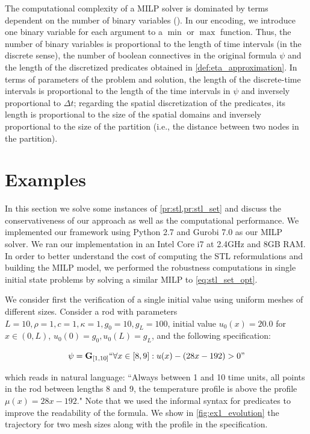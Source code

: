 \documentclass[oribibl]{llncs/llncs}
\newcommand{\Always}{\mathbf{G}}
\begin{document}
The computational complexity of a MILP solver is dominated by terms dependent on
the number of binary variables (\cite{}). In our encoding, we introduce one
binary variable for each argument to a $\min$ or $\max$ function. Thus, the
number of binary variables is proportional to the length of time intervals (in
the discrete sense), the number of boolean connectives in the original formula
$\psi$ and the length of the discretized predicates obtained in
\cref{def:eta_approximation}. In terms of parameters of the problem and solution,
the length of the discrete-time intervals is proportional to the length of the time
intervals in $\psi$ and inversely proportional to $\Delta t$; regarding the
spatial discretization of the predicates, its length is proportional to the size
of the spatial domains and inversely proportional to the size of the partition
(i.e., the distance between two nodes in the partition).

\section{Examples}
\label{sec:examples}

In this section we solve some instances of \cref{pr:stl,pr:stl_set} and discuss
the conservativeness of our approach as well as the computational performance.
We implemented our framework using Python 2.7 and Gurobi 7.0 as our MILP solver.
We ran our implementation in an Intel Core i7 at 2.4GHz and 8GB RAM. In order to
better understand the cost of computing the STL reformulations and building the
MILP model, we performed the robustness computations in single initial state
problems by solving a similar MILP to \cref{eq:stl_set_opt}.

We consider first the verification of a single initial value using uniform
meshes of different sizes. Consider a rod with parameters $L = 10, \rho = 1, c =
1, \kappa = 1, g_0 = 10, g_L = 100$, initial value $u_0(x) = 20.0$
for $x \in (0, L)$, $u_0(0) = g_0, u_0(L) = g_L$, and the following specification:

\begin{equation}
    \psi = \Always_{[1,10]} ``\forall x \in [8,9] : u(x) - (28x - 192) > 0"
\end{equation}

which reads in natural language: ``Always between 1 and 10 time units, all
points in the rod between lengths 8 and 9, the temperature profile is above the
profile $\mu(x) = 28x - 192$." Note that we used the informal syntax for
predicates to improve the readability of the formula. We show in
\cref{fig:ex1_evolution} the trajectory for two mesh sizes along with the
profile in the specification.
\end{document}
